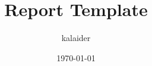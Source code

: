 \def\usetitle{}
\def\usegraphics{}



\title{Report Template}
\def\subtitle{....}
\def\edition{[reports]\ \#\ 1}
\author{kalaider}
\date{\today}


	
	\ifdefined\usetitle
	    
	\fi
	
	

